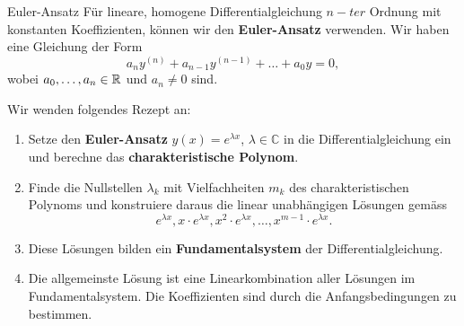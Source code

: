 \begin{Rezept}{Euler-Ansatz}{}
	Für lineare, homogene Differentialgleichung $n-ter$ Ordnung mit konstanten Koeffizienten, können wir den \textbf{Euler-Ansatz} verwenden. Wir haben eine Gleichung der Form
	\begin{equation*}
	a_n y^{(n)} + a_{n-1} y^{(n-1)} + \dots + a_0 y = 0,
	\end{equation*}
	wobei $a_0,\dots, a_n \in \mathbb{R}$ und $a_n\neq 0$ sind.
	
	Wir wenden folgendes Rezept an:
	\begin{enumerate}
		\item Setze den \textbf{Euler-Ansatz} $y(x) = e^{\lambda x}$, $\lambda \in\mathbb{C}$ in die Differentialgleichung ein und berechne das \textbf{charakteristische Polynom}.
		\item Finde die Nullstellen $\lambda_k$ mit Vielfachheiten $m_k$ des charakteristischen Polynoms und konstruiere daraus die linear unabhängigen Lösungen gemäss
		\begin{equation*}
		e^{\lambda x}, x \cdot e^{\lambda x}, x^2 \cdot e^{\lambda x}, \dots, x^{m-1} \cdot e^{\lambda x}.
		\end{equation*}
		\item Diese Lösungen bilden ein \textbf{Fundamentalsystem} der Differentialgleichung.
		\item Die allgemeinste Lösung ist eine Linearkombination aller Lösungen im Fundamentalsystem. Die Koeffizienten sind durch die Anfangsbedingungen zu bestimmen.
	\end{enumerate}
\end{Rezept}

